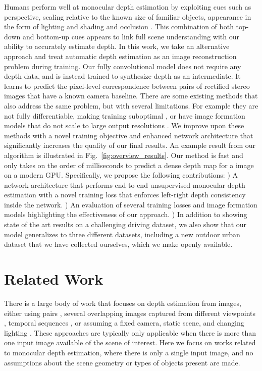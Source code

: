 \documentclass[10pt,twocolumn,letterpaper]{article}
\begin{document}
Humans perform well at monocular depth estimation by exploiting cues such as perspective, scaling relative to the known size of familiar objects, appearance in the form of lighting and shading and occlusion \cite{howard2012perceiving}.
This combination of both top-down and bottom-up cues appears to link full scene understanding with our ability to accurately estimate depth.  
In this work, we take an alternative approach and treat automatic depth estimation as an image reconstruction problem during training.
Our fully convolutional model does not require any depth data, and is instead trained to synthesize depth as an intermediate. It learns to predict the pixel-level correspondence between pairs of rectified stereo images that have a known camera baseline.
There are some existing methods that also address the same problem, but with several limitations. For example they are not fully differentiable, making training suboptimal \cite{garg2016unsupervised}, or have image formation models that do not scale to large output resolutions \cite{xie2016deep3d}.
We improve upon these methods with a novel training objective and enhanced network architecture that significantly increases the quality of our final results. 
An example result from our algorithm is illustrated in Fig.~\ref{fig:overview_results}. 
Our method is fast and only takes on the order of  milliseconds to predict a dense depth map for a  image on a modern GPU.
Specifically, we propose the following contributions:
) A network architecture that performs end-to-end unsupervised monocular depth estimation with a novel training loss that enforces left-right depth consistency inside the network.
) An evaluation of several training losses and image formation models highlighting the effectiveness of our approach.
) In addition to showing state of the art results on a challenging driving dataset, we also show that our model generalizes to three different datasets, including a new outdoor urban dataset that we have collected ourselves, which we make openly available.
\section{Related Work}
There is a large body of work that focuses on depth estimation from images, either using pairs \cite{scharstein2002taxonomy}, several overlapping images captured from different viewpoints \cite{furukawa2015multi}, temporal sequences \cite{ranftldense}, or assuming a fixed camera, static scene, and changing lighting \cite{woodham1980photometric, abrams2012heliometric}.
These approaches are typically only applicable when there is more than one input image available of the scene of interest. 
Here we focus on works related to monocular depth estimation, where there is only a single input image, and no assumptions about the scene geometry or types of objects present are made. 
\end{document}
